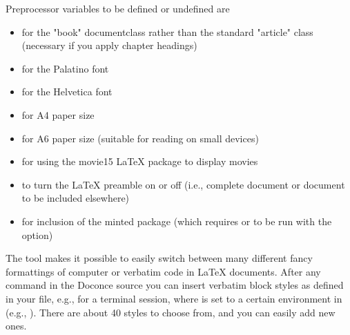 \documentclass[%
oneside,                 %
final,                   %
chapterprefix=true,      %
open=right               %
10pt]{book}
\begin{document}
{{{Preprocessor variables to be defined or undefined are

\begin{itemize}
 \item {} for the "book" documentclass rather than the standard
   "article" class (necessary if you apply chapter headings)

 \item {} for the Palatino font

 \item {} for the Helvetica font

 \item {} for A4 paper size

 \item {} for A6 paper size (suitable for reading on small devices)

 \item {} for using the movie15 {\LaTeX} package to display movies

 \item {} to turn the {\LaTeX} preamble on or off (i.e., complete document
   or document to be included elsewhere)

 \item {} for inclusion of the minted package (which requires 
   or  to be run with the  option)
\end{itemize}

\noindent
The  tool makes it possible to easily switch between many
different fancy formattings of computer or verbatim code in {\LaTeX}
documents. After any  command in the Doconce source you can
insert verbatim block styles as defined in your 
file, e.g.,  for a terminal session, where  is set to
a certain environment in  (e.g., ).
There are about 40 styles to choose from, and you can easily add
new ones.

}}}
\end{document}
